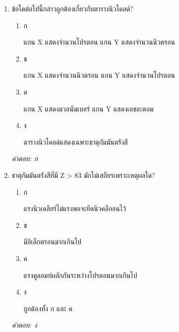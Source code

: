 \documentclass[12pt]{article}
\begin{document}
\begin{enumerate}[label=\arabic*., itemsep=0.5\baselineskip, topsep=0.5\baselineskip, leftmargin=*]
\item ข้อใดต่อไปนี้กล่าวถูกต้องเกี่ยวกับตารางนิวไคลด์?
\begin{enumerate}[label=\alph*)., itemsep=0.3\baselineskip, topsep=0.3\baselineskip]
\item ก\ 
\begin{minipage}[t]{0.9\linewidth}
\raggedright แกน X แสดงจำนวนโปรตอน แกน Y แสดงจำนวนนิวตรอน
\end{minipage}
\item ข\ 
\begin{minipage}[t]{0.9\linewidth}
\raggedright แกน X แสดงจำนวนนิวตรอน แกน Y แสดงจำนวนโปรตอน
\end{minipage}
\item ค\ 
\begin{minipage}[t]{0.9\linewidth}
\raggedright แกน X แสดงมวลนัมเบอร์ แกน Y แสดงเลขอะตอม
\end{minipage}
\item ง\ 
\begin{minipage}[t]{0.9\linewidth}
\raggedright ตารางนิวไคลด์แสดงเฉพาะธาตุกัมมันตรังสี
\end{minipage}
\end{enumerate}
\vspace{-0.3\baselineskip}
\begin{small}
\textit{คำตอบ: ก}
\end{small}

\item ธาตุกัมมันตรังสีที่มี Z > 83 มักไม่เสถียรเพราะเหตุผลใด?
\begin{enumerate}[label=\alph*)., itemsep=0.3\baselineskip, topsep=0.3\baselineskip]
\item ก\ 
\begin{minipage}[t]{0.9\linewidth}
\raggedright แรงนิวเคลียร์ไม่แรงพอจะยึดนิวคลีออนไว้
\end{minipage}
\item ข\ 
\begin{minipage}[t]{0.9\linewidth}
\raggedright มีอิเล็กตรอนมากเกินไป
\end{minipage}
\item ค\ 
\begin{minipage}[t]{0.9\linewidth}
\raggedright แรงคูลอมบ์ผลักกันระหว่างโปรตอนมากเกินไป
\end{minipage}
\item ง\ 
\begin{minipage}[t]{0.9\linewidth}
\raggedright ถูกต้องทั้ง ก และ ค
\end{minipage}
\end{enumerate}
\vspace{-0.3\baselineskip}
\begin{small}
\textit{คำตอบ: ง}
\end{small}


\end{enumerate}
\end{document}
